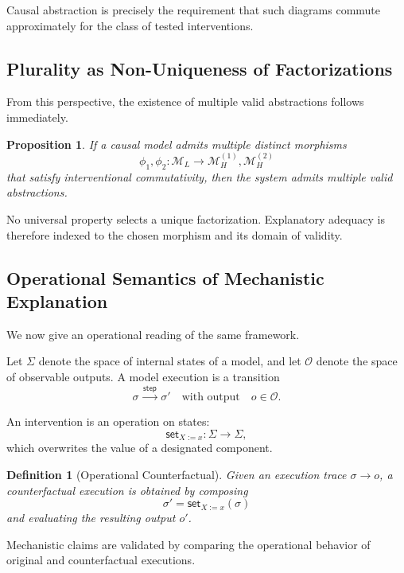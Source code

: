 \documentclass[11pt]{article}
\newtheorem{definition}{Definition}
\newtheorem{proposition}{Proposition}
\begin{document}
Causal abstraction is precisely the requirement that such diagrams commute approximately for the class of tested interventions.

\subsection{Plurality as Non-Uniqueness of Factorizations}

From this perspective, the existence of multiple valid abstractions follows immediately.

\begin{proposition}
If a causal model admits multiple distinct morphisms
\[
\phi_1, \phi_2 : \mathcal{M}_L \rightarrow \mathcal{M}_H^{(1)}, \mathcal{M}_H^{(2)}
\]
that satisfy interventional commutativity, then the system admits multiple valid abstractions.
\end{proposition}

No universal property selects a unique factorization. Explanatory adequacy is therefore indexed to the chosen morphism and its domain of validity.

\subsection{Operational Semantics of Mechanistic Explanation}

We now give an operational reading of the same framework.

Let $\Sigma$ denote the space of internal states of a model, and let $\mathcal{O}$ denote the space of observable outputs. A model execution is a transition
\[
\sigma \xrightarrow{\,\mathsf{step}\,} \sigma'
\quad \text{with output} \quad o \in \mathcal{O}.
\]

An intervention is an operation on states:
\[
\mathsf{set}_{X := x} : \Sigma \rightarrow \Sigma,
\]
which overwrites the value of a designated component.

\begin{definition}[Operational Counterfactual]
Given an execution trace $\sigma \rightarrow o$, a counterfactual execution is obtained by composing
\[
\sigma' = \mathsf{set}_{X := x}(\sigma)
\]
and evaluating the resulting output $o'$.
\end{definition}

Mechanistic claims are validated by comparing the operational behavior of original and counterfactual executions.
\end{document}
